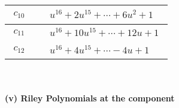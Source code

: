 \documentclass[1p]{elsarticle_modified}
\theoremstyle{definition}
\begin{document}
\begin{tabular}{m{50pt}|m{274pt}}
\hline $$\begin{aligned}c_{10}\end{aligned}$$&$\begin{aligned}
&u^{16}+2 u^{15}+\cdots+6 u^2+1
\end{aligned}$\\
\hline $$\begin{aligned}c_{11}\end{aligned}$$&$\begin{aligned}
&u^{16}+10 u^{15}+\cdots+12 u+1
\end{aligned}$\\
\hline $$\begin{aligned}c_{12}\end{aligned}$$&$\begin{aligned}
&u^{16}+4 u^{15}+\cdots-4 u+1
\end{aligned}$\\
\hline
\end{tabular}\\~\\
\newpage\renewcommand{\arraystretch}{1}
\flushleft \textbf{(v) Riley Polynomials at the component}\newline \\
\end{document}
